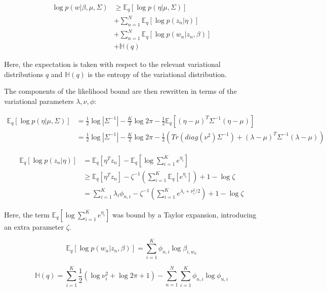 \documentclass[12pt,a4paper,twoside,openright]{report}
\begin{document}
\begin{align}\label{eq:likelihood-bound}
\log p(w | \beta, \mu, \Sigma) & \geq \mathbb{E}_q[\log p(\eta|\mu, \Sigma)] \\
& + \sum\limits_{n=1}^N \mathbb{E}_q[\log p(z_n | \eta)] \\
& + \sum\limits_{n=1}^N \mathbb{E}_q[\log p(w_n | z_n, \beta)] \\
& + \mathbb{H}(q)
\end{align}

Here, the expectation is taken with respect to the relevant variational distributions $q$ and $\mathbb{H}(q)$ is the entropy of the variational distribution.

The components of the likelihood bound are then rewritten in terms of the variational parameters $\lambda, \nu, \phi$:

\begin{align}
\mathbb{E}_q[\log p(\eta|\mu, \Sigma)] & = \frac{1}{2} \log |\Sigma^{-1}| - \frac{K}{2} \log 2 \pi - \frac{1}{2}\mathbb{E}_q[(\eta - \mu)^T\Sigma^{-1}(\eta - \mu)] \\ \label{eq:eta_mu_sigma}
& = \frac{1}{2} \log |\Sigma^{-1}| - \frac{K}{2} \log 2 \pi - \frac{1}{2}(\mathit{Tr}(\mathit{diag}(\nu^2)\Sigma^{-1}) + (\lambda - \mu)^T\Sigma^{-1}(\lambda - \mu))
\end{align}

\begin{align}
\mathbb{E}_q[\log p(z_n | \eta)] & = \mathbb{E}_q[\eta^Tz_n] - \mathbb{E}_q[\log \sum\limits_{i=1}^K e^{\eta_i}] \\
& \geq \mathbb{E}_q[\eta^Tz_n] - \zeta^{-1}\left(\sum\limits_{i=1}^K\mathbb{E}_q[e^{\eta_i}]\right) + 1 - \log\zeta \\
& = \sum\limits_{i=1}^K\lambda_i\phi_{n, i} - \zeta^{-1}\left(\sum\limits_{i=1}^Ke^{\lambda_i + \nu_i^2 / 2}\right) + 1 - \log\zeta
\end{align}

Here, the term $\mathbb{E}_q[\log \sum\limits_{i=1}^K e^{\eta_i}]$ was bound by a Taylor expansion, introducing an extra parameter $\zeta$.

\begin{equation}
\mathbb{E}_q[\log p(w_n | z_n, \beta)] = \sum\limits_{i=1}^K\phi_{n,i}\log\beta_{i, w_n}
\end{equation}

\begin{equation}
\mathbb{H}(q) = \sum\limits_{i=1}^K\frac{1}{2}(\log\nu_i^2 + \log 2 \pi + 1) - \sum\limits_{n=1}^N\sum\limits_{i=1}^K\phi_{n,i}\log\phi_{n,i}
\end{equation}
\end{document}
